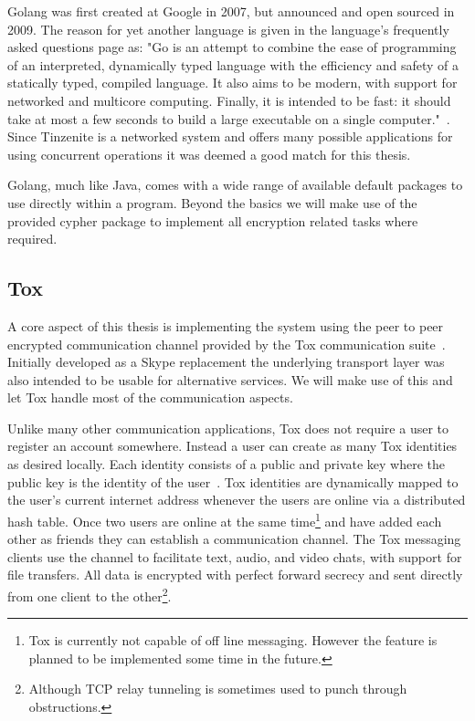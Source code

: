 Golang was first created at Google in 2007, but announced and open sourced in 2009.
The reason for yet another language is given in the language's frequently asked questions page as: "Go is an attempt to combine the ease of programming of an interpreted, dynamically typed language with the efficiency and safety of a statically typed, compiled language. It also aims to be modern, with support for networked and multicore computing. Finally, it is intended to be fast: it should take at most a few seconds to build a large executable on a single computer."~\cite{web:site:golang:faq}.
Since Tinzenite is a networked system and offers many possible applications for using concurrent operations it was deemed a good match for this thesis.

Golang, much like Java, comes with a wide range of available default packages to use directly within a program.
Beyond the basics we will make use of the provided cypher package to implement all encryption related tasks where required.

\subsection{Tox}
\label{sub:Tox}

A core aspect of this thesis is implementing the system using the peer to peer encrypted communication channel provided by the Tox communication suite~\cite{web:site:tox}.
Initially developed as a Skype replacement the underlying transport layer was also intended to be usable for alternative services.
We will make use of this and let Tox handle most of the communication aspects.

Unlike many other communication applications, Tox does not require a user to register an account somewhere.
Instead a user can create as many Tox identities as desired locally.
Each identity consists of a public and private key where the public key is the identity of the user~\cite{web:site:tox:crypto}.
Tox identities are dynamically mapped to the user's current internet address whenever the users are online via a distributed hash table.
Once two users are online at the same time\footnote{Tox is currently not capable of off line messaging. However the feature is planned to be implemented some time in the future.} and have added each other as friends they can establish a communication channel.
The Tox messaging clients use the channel to facilitate text, audio, and video chats, with support for file transfers.
All data is encrypted with perfect forward secrecy and sent directly from one client to the other\footnote{Although TCP relay tunneling is sometimes used to punch through obstructions.}.

